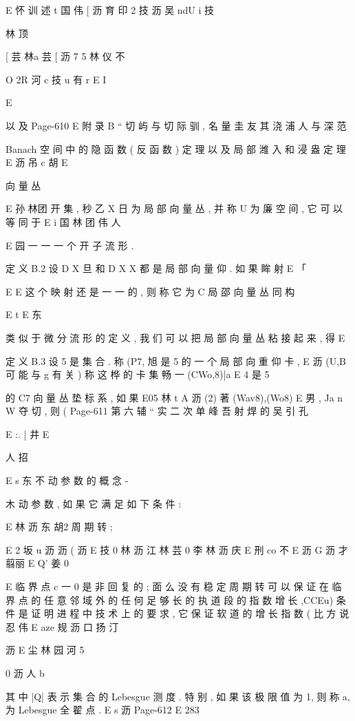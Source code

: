 {E 怀 训 述 t 国 伟
[ 沥 育 印 2 技 沥 吴 ndU i 技

林 顶

[ 芸 林a 芸
[ 沥 7 5
林 仪 不

O 2R 河 c 技 u
有 r E I

E

以 及
Page-610
E 附 录 B “ 切 屿 与 切 际 驯 , 名 量 圭 友 其 浇 浦 人 与 深 范

Banach 空 间 中 的 隐 函 数 ( 反 函 数 ) 定 理 以 及 局 部 潍 入 和 浸 盎 定 理
E 沥 吊 c 胡
E

向 量 丛

E 孙 林团
开 集 , 秒 乙 X 日 为 局 部 向 量 丛 , 并 称 U 为 廉 空 间 , 它 可 以 等 同 于
E i 国 林
团 伟
人

E 园 一 一
一 个 开 子 流 形 .

定 义 B.2 设 D X 旦 和 D X X 都 是 局 部 向 量 仰 . 如 果 眸 射
E 「

E
E
这 个 映 射 还 是 一 一 的 , 则 称 它 为 C 局 邵 向 量 丛 同 构

E
t
E 东

类 似 于 微 分 流 形 的 定 义 , 我 们 可 以 把 局 部 向 量 丛 粘 接 起 来 , 得
E

定 义 B.3 设 5 是 集 合 . 称 (P7, 旭 是 5 的 一 个 局 部 向 重 仰 卡 ,
E 沥
(U,B 可 能 与 g 有 关 ) 称 这 桦 的 卡 集 畅 一 (CWo,8)|a E 4 是 5

的 C7 向 量 丛 垫 标 系 , 如 果
E05 林 t A 沥
(2) 著 (Wav8),(Wo8) E 男 , Ja n W 夺 切 , 则 (
Page-611
第 六 辅 “ 实 二 次 单 峰 吾 射 焊 的 吴 引 孔

E :. | 井
E

人 招

E s 东 不
动 参 数 的 概 念 -

木
动 参 数 , 如 果 它 满 足 如 下 条 件 :

E 林 沥 东 胡2
周 期 转 ;

E 2 坂 u 沥 沥 ( 沥
E 技 0 林 沥 江 林 芸 0 李 林 沥 庆
E 刑 co 不
E 沥 G 沥 才
翦丽 E Q' 姜 0

E
临 界 点 c 一 0 是 非 回 复 的 ; 面 么 没 有 稳 定 周 期 转 可 以 保 证 在 临 界
点 的 任 意 邻 域 外 的 任 何 足 够 长 的 执 道 段 的 指 数 增 长 ,CCEu) 条 件
是 证 明 进 程 中 技 术 上 的 要 求 , 它 保 证 软 道 的 增 长 指 数 ( 比 方 说 忍
伟
E aze 规 沥 口 扬 汀

沥
E 尘 林 园 河 5

0 沥 人
b

其 中 |Q| 表 示 集 合 的 Lebesgue 测 度 . 特 别 , 如 果 该 极 限 值 为 1,
则 称 a, 为 Lebesgue 全 翟 点 .
E s 沥
Page-612
E 283

}
